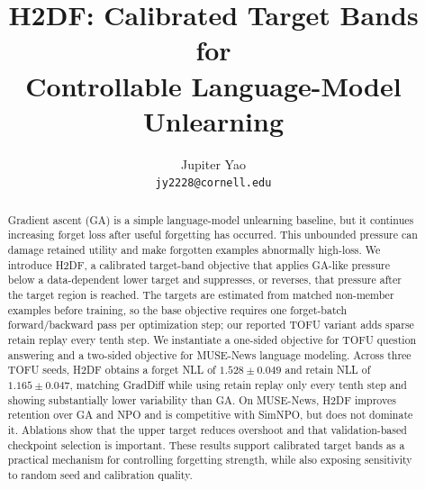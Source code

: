 \documentclass[10pt,twocolumn]{article}
\title{\vspace{-1.2em}\textbf{H2DF: Calibrated Target Bands for\\
Controllable Language-Model Unlearning}}
\author{Jupiter Yao\\\texttt{jy2228@cornell.edu}}
\date{}
\newcommand{\method}{\textsc{H2DF}}
\begin{document}
\maketitle

\begin{abstract}
Gradient ascent (GA) is a simple language-model unlearning baseline, but it
continues increasing forget loss after useful forgetting has occurred. This
unbounded pressure can damage retained utility and make forgotten examples
abnormally high-loss. We introduce \method, a calibrated target-band objective
that applies GA-like pressure below a data-dependent lower target and suppresses,
or reverses, that pressure after the target region is reached. The targets are
estimated from matched non-member examples before training, so the base objective
requires one forget-batch forward/backward pass per optimization step; our
reported TOFU variant adds sparse retain replay every tenth step. We instantiate
a one-sided objective for TOFU question answering and a two-sided objective for
MUSE-News language modeling. Across three TOFU seeds, \method{} obtains a forget
NLL of $1.528\pm0.049$ and retain NLL of $1.165\pm0.047$, matching GradDiff
while using retain replay only every tenth step and showing substantially lower
variability than GA. On MUSE-News, \method{} improves retention over GA and NPO
and is competitive with SimNPO, but does not dominate it. Ablations show that the
upper target reduces overshoot and that validation-based checkpoint selection is
important. These results support calibrated target bands as a practical mechanism
for controlling forgetting strength, while also exposing sensitivity to random
seed and calibration quality.
\end{abstract}
\end{document}
